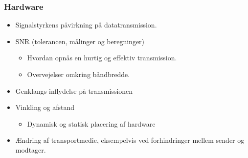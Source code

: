 \subsubsection{Hardware}

\begin{itemize}[noitemsep]
  \item Signalstyrkens påvirkning på datatransmission.
  \item SNR (tolerancen, målinger og beregninger)
  \begin{itemize}[noitemsep]
  \item Hvordan opnås en hurtig og effektiv transmission.
  \item Overvejelser omkring båndbredde.
  \end{itemize}
  \item Genklangs inflydelse på transmissionen
  \item Vinkling og afstand
  \begin{itemize}[noitemsep]
  \item Dynamisk og statisk placering af hardware
  \end{itemize}
  \item Ændring af transportmedie, eksempelvis ved forhindringer mellem sender og modtager.
\end{itemize}